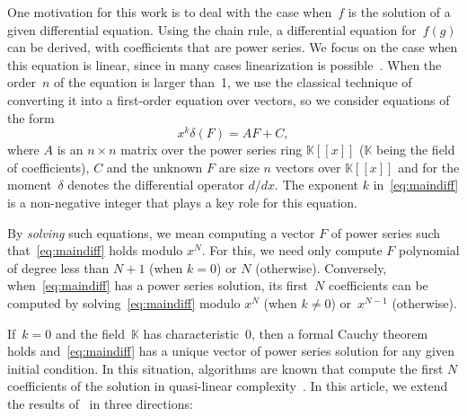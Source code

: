 \documentclass[]{sig-alternate}
\def\partial{\delta}
\def\K {\ensuremath{\mathbb{K}}}
\def\mA {\ensuremath{{A}}}
\def\mC {\ensuremath{{C}}}
\def\mF {\ensuremath{{F}}}
\begin{document}
One motivation for this work is to deal with the case when~$f$ is the solution of a
given differential equation. Using the chain rule, a differential
equation for~$f(g)$ can be derived, with coefficients that are power
series. We focus on the case when this equation is linear, since in
many cases linearization is possible~\cite{BoChOlSaScSc07}. When the
order~$n$ of the equation is larger than~1, we use the classical
technique of converting it into a first-order equation over vectors,
so we consider equations of the form
\begin{equation}\label{eq:maindiff}
x^k \partial(\mF) = \mA \mF + \mC,
\end{equation}
where $\mA$ is an $n\times n$ matrix over the power series ring
$\K[[x]]$ ($\K$ being the field of coefficients), $\mC$ and the
unknown $\mF$ are size $n$ vectors over $\K[[x]]$ and for the
moment~$\partial$ denotes the differential operator $d/dx$.  The
exponent $k$ in~\eqref{eq:maindiff} is a non-negative integer that
plays a key role for this equation.

By {\em solving} such equations, we mean computing a vector $\mF$ of
power series such that~\eqref{eq:maindiff} holds modulo $x^N$. For
this, we need only compute $\mF$ polynomial of degree less than $N+1$
(when $k=0$) or $N$ (otherwise). Conversely, when~\eqref{eq:maindiff}
has a power series solution, its first~$N$ coefficients can be computed
by solving~\eqref{eq:maindiff} modulo $x^N$ (when $k\neq0$) or~$x^{N-1}$
(otherwise).

If~$k=0$ and the field~$\K$ has characteristic~0, then a formal Cauchy
theorem holds and~\eqref{eq:maindiff} has a unique vector of power
series solution for any given initial condition. In this situation,
algorithms are known that compute the first $N$ coefficients of the
solution in quasi-linear complexity~\cite{BoChOlSaScSc07}. In this
article, we extend the results of~\cite{BoChOlSaScSc07} in three
directions:
\end{document}
